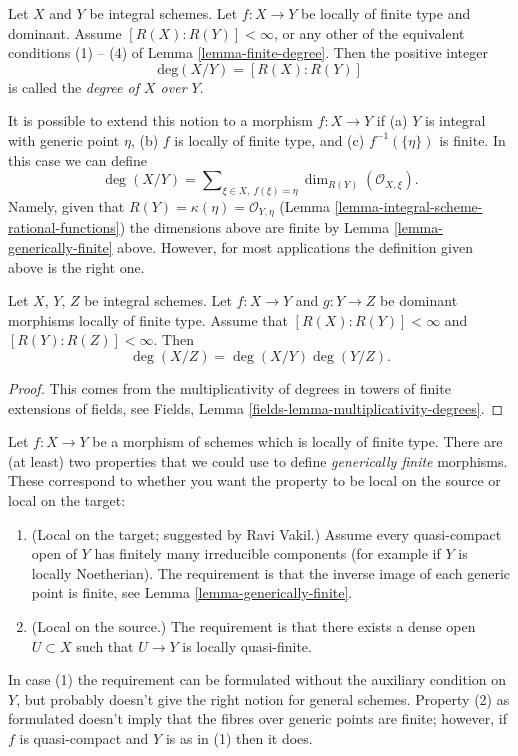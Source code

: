 \begin{definition}
\label{definition-degree}
Let $X$ and $Y$ be integral schemes.
Let $f : X \to Y$ be locally of finite type and dominant.
Assume $[R(X) : R(Y)] < \infty$, or any other of the equivalent
conditions (1) -- (4) of Lemma \ref{lemma-finite-degree}.
Then the positive integer
$$
\text{deg}(X/Y) = [R(X) : R(Y)]
$$
is called the {\it degree of $X$ over $Y$}.
\end{definition}

\noindent
It is possible to extend this notion to a morphism
$f : X \to Y$ if (a) $Y$ is integral with generic point $\eta$,
(b) $f$ is locally of finite type, and (c) $f^{-1}(\{\eta\})$ is finite.
In this case we can define
$$
\deg(X/Y)
=
\sum\nolimits_{\xi \in X, \ f(\xi) = \eta}
\dim_{R(Y)} (\mathcal{O}_{X, \xi}).
$$
Namely, given that $R(Y) = \kappa(\eta) = \mathcal{O}_{Y, \eta}$
(Lemma \ref{lemma-integral-scheme-rational-functions})
the dimensions above are finite by
Lemma \ref{lemma-generically-finite} above.
However, for most applications the definition given above
is the right one.

\begin{lemma}
\label{lemma-degree-composition}
Let $X$, $Y$, $Z$ be integral schemes.
Let $f : X \to Y$ and $g : Y \to Z$ be dominant morphisms locally
of finite type. Assume that $[R(X) : R(Y)] < \infty$ and
$[R(Y) : R(Z)] < \infty$. Then
$$
\deg(X/Z) = \deg(X/Y) \deg(Y/Z).
$$
\end{lemma}

\begin{proof}
This comes from the multiplicativity of degrees in towers
of finite extensions of fields, see
Fields, Lemma \ref{fields-lemma-multiplicativity-degrees}.
\end{proof}

\begin{remark}
\label{remark-definition-generically-finite}
Let $f : X \to Y$ be a morphism of schemes which is locally of finite type.
There are (at least) two properties that we could use to define
{\it generically finite} morphisms. These correspond to whether you
want the property to be local on the source or local on the target:
\begin{enumerate}
\item (Local on the target; suggested by Ravi Vakil.)
Assume every quasi-compact open of $Y$ has finitely
many irreducible components (for example if $Y$ is locally Noetherian).
The requirement is that the inverse image of each generic point is finite, see
Lemma \ref{lemma-generically-finite}.
\item (Local on the source.) The requirement is that there exists
a dense open $U \subset X$ such that $U \to Y$ is locally quasi-finite.
\end{enumerate}
In case (1) the requirement can be formulated without the auxiliary
condition on $Y$, but probably doesn't give the right notion for
general schemes. Property (2) as formulated doesn't imply that the fibres
over generic points are finite; however, if $f$ is
quasi-compact and $Y$ is as in (1) then it does.
\end{remark}

